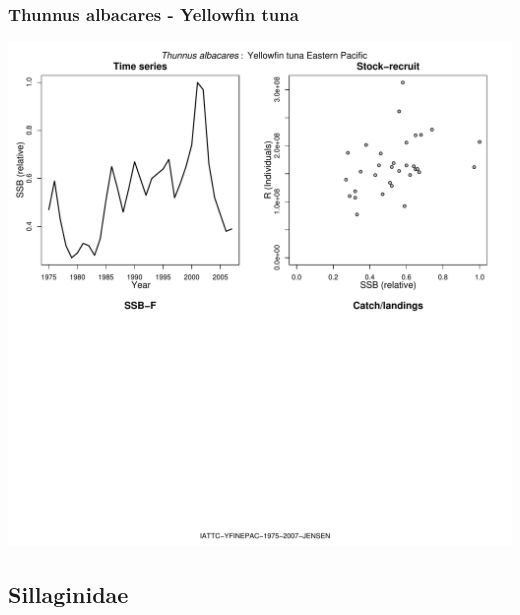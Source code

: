 \subsubsection{Thunnus albacares - Yellowfin tuna}
\begin{center}
\includegraphics[width=1.2\textwidth]{../R/figures/IATTC-YFINEPAC-1975-2007-JENSEN.pdf}
\end{center}

\subsection{Sillaginidae}

